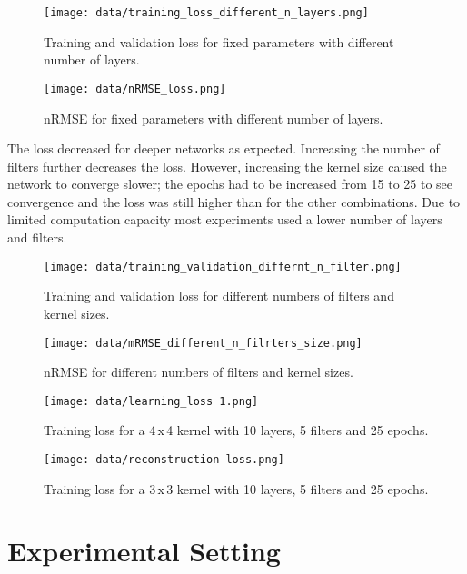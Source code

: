 \begin{figure}[h]
  \centering
  \texttt{[image: data/training\_loss\_different\_n\_layers.png]}
  \caption{Training and validation loss for fixed parameters with different number of layers.}
\end{figure}

\begin{figure}[h]
  \centering
  \texttt{[image: data/nRMSE\_loss.png]}
  \caption{nRMSE for fixed parameters with different number of layers.}
\end{figure}

The loss decreased for deeper networks as expected. Increasing the number of filters further decreases the loss. However, increasing the kernel size caused the network to converge slower; the epochs had to be increased from 15 to 25 to see convergence and the loss was still higher than for the other combinations. Due to limited computation capacity most experiments used a lower number of layers and filters.

\begin{figure}[h]
  \centering
  \texttt{[image: data/training\_validation\_differnt\_n\_filter.png]}
  \caption{Training and validation loss for different numbers of filters and kernel sizes.}
\end{figure}

\begin{figure}[h]
  \centering
  \texttt{[image: data/mRMSE\_different\_n\_filrters\_size.png]}
  \caption{nRMSE for different numbers of filters and kernel sizes.}
\end{figure}

\begin{figure}[h]
  \centering
  \texttt{[image: data/learning\_loss 1.png]}
  \caption{Training loss for a 4\,x\,4 kernel with 10 layers, 5 filters and 25 epochs.}
\end{figure}

\begin{figure}[h]
  \centering
  \texttt{[image: data/reconstruction loss.png]}
  \caption{Training loss for a 3\,x\,3 kernel with 10 layers, 5 filters and 25 epochs.}
\end{figure}

\chapter{Experimental Setting}

